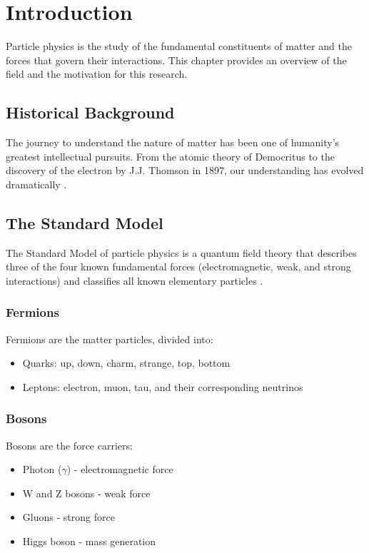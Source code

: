 \chapter{Introduction}
\label{ch:introduction}

Particle physics is the study of the fundamental constituents of matter and the forces that govern their interactions. This chapter provides an overview of the field and the motivation for this research.

\section{Historical Background}

The journey to understand the nature of matter has been one of humanity's greatest intellectual pursuits. From the atomic theory of Democritus to the discovery of the electron by J.J. Thomson in 1897, our understanding has evolved dramatically \cite{thomson1897}.

\section{The Standard Model}

The Standard Model of particle physics is a quantum field theory that describes three of the four known fundamental forces (electromagnetic, weak, and strong interactions) and classifies all known elementary particles \cite{standardmodel}.

\subsection{Fermions}

Fermions are the matter particles, divided into:
\begin{itemize}
  \item Quarks: up, down, charm, strange, top, bottom
  \item Leptons: electron, muon, tau, and their corresponding neutrinos
\end{itemize}

\subsection{Bosons}

Bosons are the force carriers:
\begin{itemize}
  \item Photon ($\gamma$) - electromagnetic force
  \item W and Z bosons - weak force
  \item Gluons - strong force
  \item Higgs boson - mass generation
\end{itemize}

